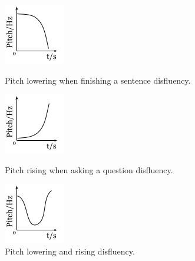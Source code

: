 \begin{figure}[H] 
  \begin{minipage}[b]{0.5\linewidth}
    \centering
    \includegraphics[width=.35\linewidth]{images/PitchLowering.png} 
    \caption{Pitch lowering when finishing a sentence disfluency.} 
    \label{fig:lowering}
    \vspace{4ex}
  \end{minipage}%
  \hspace{3mm}
  \begin{minipage}[b]{0.5\linewidth}
    \centering
    \includegraphics[width=.35\linewidth]{images/PitchRaising.png} 
    \caption{Pitch rising when asking a question disfluency.} 
    \label{fig:rising}
    \vspace{4ex}
  \end{minipage} 
  \begin{minipage}[b]{0.5\linewidth}
    \centering
    \includegraphics[width=.35\linewidth]{images/PitchLoweringRising.png} 
    \caption{Pitch lowering and rising disfluency.} 
    \label{fig:loweringRising}
    \vspace{4ex}
  \end{minipage}%

\end{figure}
